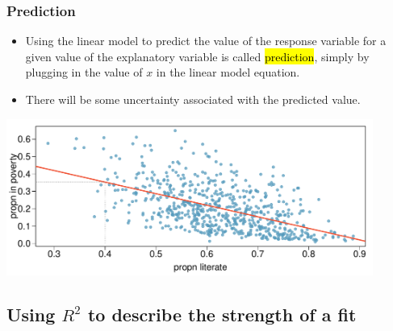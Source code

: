 \documentclass[notes,11pt, aspectratio=169]{beamer}
\begin{document}
\begin{frame}
\frametitle{Prediction}

\begin{itemize}

\item Using the linear model to predict the value of the response variable for a given value of the explanatory variable is called \hl{prediction}, simply by plugging in the value of $x$ in the linear model equation.

\item There will be some uncertainty associated with the predicted value.

\end{itemize}

\begin{center}
\includegraphics[width=0.9\textwidth]{graphs/l08f12}
\end{center}

\end{frame}



\subsection{Using $R^2$ to describe the strength of a fit}

\end{document}
